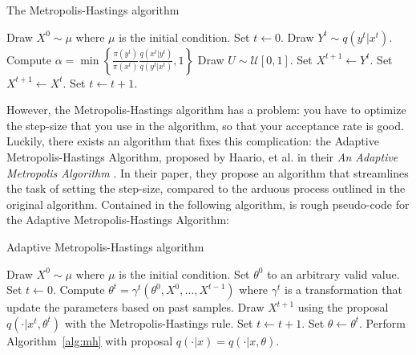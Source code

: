 \documentclass[12pt,preprint]{aastex}
\begin{document}
\begin{algorithm}
\caption{The Metropolis-Hastings algorithm}
\label{alg:mh}
\begin{algorithmic}[1]

  \STATE Draw $X^0\sim\mu$ where $\mu$ is the initial condition.
  \STATE Set $t\leftarrow0$.
  \REPEAT
    \STATE Draw $Y^t\sim q(y^t|x^t)$.
    \STATE Compute $\alpha = \min\left\{
      \frac{\pi(y^t)}{\pi(x^t)}\frac{q(x^t|y^t)}{q(y^t|x^t)}, 1\right\}$
    \STATE Draw $U\sim\mathcal{U}[0,1]$.
      \STATE Set $X^{t+1}\leftarrow Y^t$.
    \ELSE
      \STATE Set $X^{t+1}\leftarrow X^t$.
    \ENDIF
    \STATE Set $t\leftarrow t+1$.

\end{algorithmic}
\end{algorithm}

However, the Metropolis-Hastings algorithm has a problem: you have to optimize the step-size that you use in the algorithm, so that your acceptance rate is good. Luckily, there exists an algorithm that fixes this complication: the Adaptive Metropolis-Hastings Algorithm, proposed by Haario, et al. in their \emph{An Adaptive Metropolis Algorithm} \cite{haario2001}. In their paper, they propose an algorithm that streamlines the task of setting the step-size, compared to the arduous process outlined in the original algorithm. Contained in the following algorithm, is rough pseudo-code for the Adaptive Metropolis-Hastings Algorithm:

\begin{algorithm}
\caption{Adaptive Metropolis-Hastings algorithm}
\label{alg:adaptive_mh}
\begin{algorithmic}
  \STATE Draw $X^0\sim\mu$ where $\mu$ is the initial condition.
  \STATE Set $\theta^0$ to an arbitrary valid value.
  \STATE Set $t\leftarrow0$.
  \REPEAT
      \STATE Compute $\theta^t = \gamma^t(\theta^0,X^0,\dots,X^{t-1})$ where
      $\gamma^t$ is a transformation that update the parameters based on past
      samples.
      \STATE Draw $X^{t + 1}$ using the proposal $q(\cdot|x^t,\theta^t)$ with
      the Metropolis-Hastings rule.
      \STATE Set $t\leftarrow t+1$.
  \STATE Set $\theta\leftarrow\theta^t$.
  \STATE Perform Algorithm~\ref{alg:mh} with proposal $q(\cdot|x) =
  q(\cdot|x,\theta)$.
\end{algorithmic}
\end{algorithm}
\end{document}

